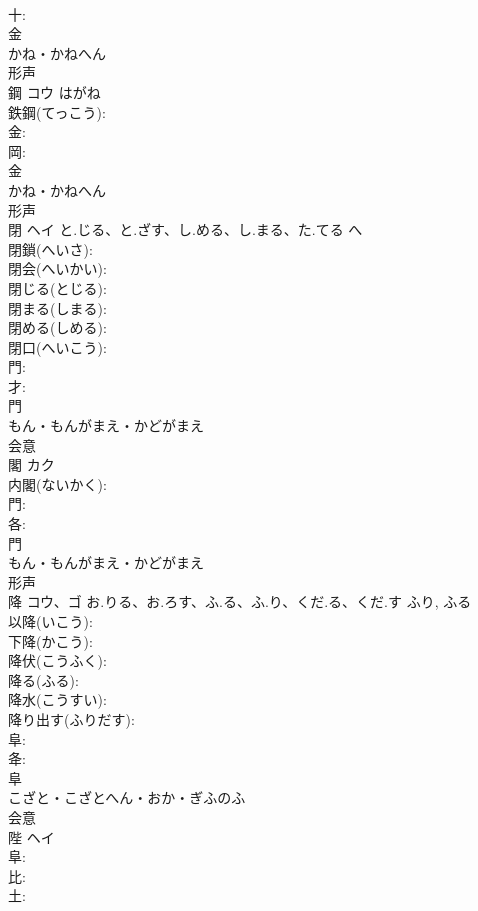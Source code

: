 \documentclass[8pt]{extreport}
\begin{document}
\begin{CJK}{UTF8}{min}
\\	十: 
\\	金	
\\	かね・かねへん	
\\	形声 
\\	鋼	コウ	はがね		
\\	鉄鋼(てっこう): 
\\	金: 
\\	岡: 
\\	金	
\\	かね・かねへん	
\\	形声 
\\	閉	ヘイ	と.じる、と.ざす、し.める、し.まる、た.てる	へ	
\\	閉鎖(へいさ): 
\\	閉会(へいかい): 
\\	閉じる(とじる): 
\\	閉まる(しまる): 
\\	閉める(しめる): 
\\	閉口(へいこう): 
\\	門: 
\\	才: 
\\	門	
\\	もん・もんがまえ・かどがまえ	
\\	会意 
\\	閣	カク			
\\	内閣(ないかく): 
\\	門: 
\\	各: 
\\	門	
\\	もん・もんがまえ・かどがまえ	
\\	形声 
\\	降	コウ、ゴ	お.りる、お.ろす、ふ.る、ふ.り、くだ.る、くだ.す	ふり, ふる	
\\	以降(いこう): 
\\	下降(かこう): 
\\	降伏(こうふく): 
\\	降る(ふる): 
\\	降水(こうすい): 
\\	降り出す(ふりだす): 
\\	阜: 
\\	夅: 
\\	阜	
\\	こざと・こざとへん・おか・ぎふのふ	
\\	会意 
\\	陛	ヘイ			
\\	阜: 
\\	比: 
\\	土: 

\end{CJK}
\end{document}
